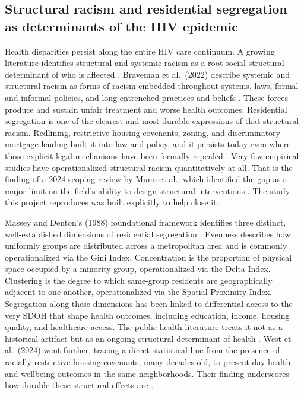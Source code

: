 \documentclass[11pt,letterpaper]{article}
\begin{document}
\subsection{Structural racism and residential segregation as determinants of the HIV epidemic}
Health disparities persist along the entire HIV care continuum. A growing literature identifies structural and systemic racism as a root social-structural determinant of who is affected \cite{burton2023, braveman2022, bowleg2022}. Braveman et al.\ (2022) describe systemic and structural racism as forms of racism embedded throughout systems, laws, formal and informal policies, and long-entrenched practices and beliefs \cite{braveman2022}. These forces produce and sustain unfair treatment and worse health outcomes. Residential segregation is one of the clearest and most durable expressions of that structural racism. Redlining, restrictive housing covenants, zoning, and discriminatory mortgage lending built it into law and policy, and it persists today even where those explicit legal mechanisms have been formally repealed \cite{braveman2022, steil2023}. Very few empirical studies have operationalized structural racism quantitatively at all. That is the finding of a 2024 scoping review by Muno et al., which identified the gap as a major limit on the field's ability to design structural interventions \cite{muno2024}. The study this project reproduces was built explicitly to help close it.

Massey and Denton's (1988) foundational framework identifies three distinct, well-established dimensions of residential segregation \cite{massey1988}. Evenness describes how uniformly groups are distributed across a metropolitan area and is commonly operationalized via the Gini Index. Concentration is the proportion of physical space occupied by a minority group, operationalized via the Delta Index. Clustering is the degree to which same-group residents are geographically adjacent to one another, operationalized via the Spatial Proximity Index. Segregation along these dimensions has been linked to differential access to the very SDOH that shape health outcomes, including education, income, housing quality, and healthcare access. The public health literature treats it not as a historical artifact but as an ongoing structural determinant of health \cite{steil2023, drexel_resource}. West et al.\ (2024) went further, tracing a direct statistical line from the presence of racially restrictive housing covenants, many decades old, to present-day health and wellbeing outcomes in the same neighborhoods. Their finding underscores how durable these structural effects are \cite{west2024}.
\end{document}
